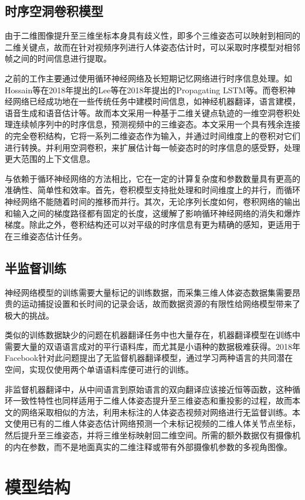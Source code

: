\subsection{时序空洞卷积模型}{}
由于二维图像提升至三维坐标本身具有歧义性，即多个三维姿态可以映射到相同的二维关键点，故而在针对视频序列进行人体姿态估计时，可以采取时序模型对相邻帧之间的时间信息进行提取。

之前的工作主要通过使用循环神经网络及长短期记忆网络进行时序信息处理。如Hossain等在2018年提出的Lee等在2018年提出的Propagating LSTM等。而卷积神经网络已经成功地在一些传统任务中建模时间信息，如神经机器翻译，语言建模，语音生成和语音估计等。故而本文采用一种基于二维关键点轨迹的一维空洞卷积处理连续帧序列中的时序信息，预测视频中的三维姿态。本文采用一个具有残余连接的完全卷积结构，它将一系列二维姿态作为输入，并通过时间维度上的卷积对它们进行转换。并利用空洞卷积，来扩展估计每一帧姿态时的时序信息的感受野，处理更大范围的上下文信息。

与依赖于循环神经网络的方法相比，它在一定的计算复杂度和参数数量具有更高的准确性、简单性和效率。首先，卷积模型支持批处理和时间维度上的并行，而循环神经网络不能随着时间的推移而并行。其次，无论序列长度如何，卷积网络的输出和输入之间的梯度路径都有固定的长度，这缓解了影响循环神经网络的消失和爆炸梯度。除此之外，卷积结构还可以对平级的时序信息有更为精确的感知，更适用于在三维姿态估计任务。

\subsection{半监督训练}{}
神经网络模型的训练需要大量标记的训练数据，而采集三维人体姿态数据集需要昂贵的运动捕捉设置和长时间的记录会话，故而数据资源的有限性给网络模型带来了极大的挑战。

类似的训练数据缺少的问题在机器翻译任务中也大量存在，机器翻译模型在训练中需要大量的双语语言成对的平行语料库，而尤其是小语种的数据极难获得。2018年Facebook针对此问题提出了无监督机器翻译模型，通过学习两种语言的共同潜在空间，实现仅使用两个单语语料库便可进行的训练。

非监督机器翻译中，从中间语言到原始语言的双向翻译应该接近恒等函数，这种循环一致性特性也同样适用于二维人体姿态提升至三维姿态和重投影的过程，故而本文的网络采取相似的方法，利用未标注的人体姿态视频对网络进行无监督训练。本文使用已有的二维人体姿态估计网络预测一个未标记视频的二维人体关节点坐标，然后提升至三维姿态，并将三维坐标映射回二维空间。所需的额外数据仅有摄像机的内在参数，而不是地面真实的二维注释或带有外部摄像机参数的多视角图像。

\section{模型结构}
